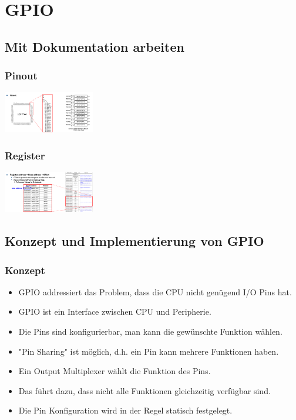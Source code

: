 \section{GPIO}

\subsection{Mit Dokumentation arbeiten}
\subsubsection{Pinout}
\includegraphics[width=0.3\textwidth]{sections/images/pinout.png}

\subsubsection{Register}
\includegraphics[width=0.3\textwidth]{sections/images/register.png}

\subsection{Konzept und Implementierung von GPIO}
\subsubsection{Konzept}
\begin{itemize}
    \item GPIO addressiert das Problem, dass die CPU nicht genügend I/O Pins hat.
    \item GPIO ist ein Interface zwischen CPU und Peripherie.
    \item Die Pins sind konfigurierbar, man kann die gewünschte Funktion wählen.
    \item "Pin Sharing" ist möglich, d.h. ein Pin kann mehrere Funktionen haben.
    \item Ein Output Multiplexer wählt die Funktion des Pins.
    \item Das führt dazu, dass nicht alle Funktionen gleichzeitig verfügbar sind.
    \item Die Pin Konfiguration wird in der Regel statisch festgelegt.
\end{itemize}

